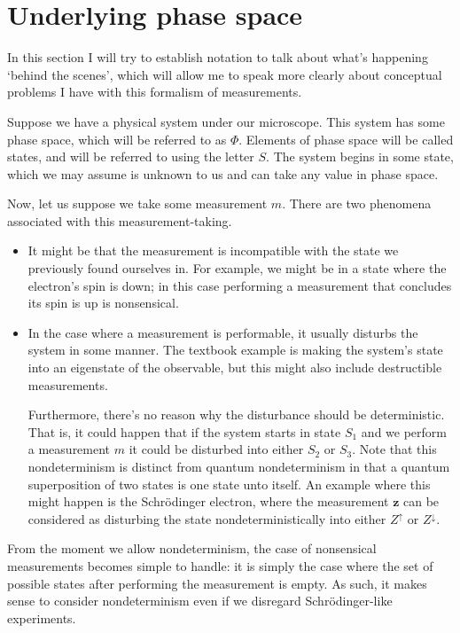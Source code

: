 \documentclass{article}
\theoremstyle{definition}
\theoremstyle{plain}
\begin{document}
\section{Underlying phase space}

In this section I will try to establish notation to talk about what's happening `behind the scenes', which will allow me to speak more clearly about conceptual problems I have with this formalism of measurements.

Suppose we have a physical system under our microscope. This system has some phase space, which will be referred to as $\Phi$. Elements of phase space will be called states, and will be referred to using the letter $S$. The system begins in some state, which we may assume is unknown to us and can take any value in phase space.

Now, let us suppose we take some measurement $m$. There are two phenomena associated with this measurement-taking.

\begin{itemize}
\item It might be that the measurement is incompatible with the state we previously found ourselves in. For example, we might be in a state where the electron's spin is down; in this case performing a measurement that concludes its spin is up is nonsensical.

\item In the case where a measurement is performable, it usually disturbs the system in some manner. The textbook example is making the system's state into an eigenstate of the observable, but this might also include destructible measurements.

Furthermore, there's no reason why the disturbance should be deterministic. That is, it could happen that if the system starts in state $S_1$ and we perform a measurement $m$ it could be disturbed into either $S_2$ or $S_3$. Note that this nondeterminism is distinct from quantum nondeterminism in that a quantum superposition of two states is one state unto itself. An example where this might happen is the Schrödinger electron, where the measurement $\mathbf{z}$ can be considered as disturbing the state nondeterministically into either $Z^\uparrow$ or $Z^\downarrow$.
\end{itemize}

From the moment we allow nondeterminism, the case of nonsensical measurements becomes simple to handle: it is simply the case where the set of possible states after performing the measurement is empty. As such, it makes sense to consider nondeterminism even if we disregard Schrödinger-like experiments.
\end{document}
